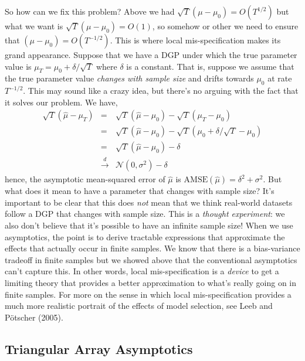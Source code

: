 \documentclass[12pt]{article}
\theoremstyle{definition}
\begin{document}
So how can we fix this problem? Above we had $ \sqrt{T}\left(\mu - \mu_0\right) = O(T^{1/2})$ but what we want is $\sqrt{T}\left(\mu - \mu_0 \right) = O(1)$, so somehow or other we need to ensure that $\left(\mu - \mu_0 \right) = O(T^{-1/2})$. This is where local mis-specification makes its grand appearance. Suppose that we have a DGP under which the true parameter value is $\mu_T = \mu_0 + \delta/\sqrt{T}$ where $\delta$ is a constant. That is, suppose we assume that the true parameter value \emph{changes with sample size} and drifts towards $\mu_0$ at rate $T^{-1/2}$. This may sound like a crazy idea, but there's no arguing with the fact that it solves our problem. We have,
\begin{eqnarray*}
	\sqrt{T}\left( \widehat{\mu} - \mu_T\right) &=& \sqrt{T}\left(\widehat{\mu} - \mu_0 \right) - \sqrt{T}\left(\mu_T - \mu_0 \right)\\
		&=&\sqrt{T}\left(\widehat{\mu} - \mu_0 \right) - \sqrt{T}\left(\mu_0 + \delta/\sqrt{T} - \mu_0 \right)\\
		&=& \sqrt{T}\left(\widehat{\mu} - \mu_0 \right) - \delta\\
		&\overset{d}{\rightarrow}& \mathcal{N}(0, \sigma^2) - \delta
\end{eqnarray*}
hence, the asymptotic mean-squared error of $\widehat{\mu}$ is $\mbox{AMSE}(\widehat{\mu}) = \delta^2 + \sigma^2$. But what does it mean to have a parameter that changes with sample size? It's important to be clear that this does \emph{not} mean that we think real-world datasets follow a DGP that changes with sample size. This is a \emph{thought experiment}: we also don't believe that it's possible to have an infinite sample size! When we use asymptotics, the point is to derive tractable expressions that approximate the effects that actually occur in finite samples. We know that there is a bias-variance tradeoff in finite samples but we showed above that the conventional asymptotics can't capture this. In other words, local mis-specification is a \emph{device} to get a limiting theory that provides a better approximation to what's really going on in finite samples. For more on the sense in which local mis-specification provides a much more realistic portrait of the effects of model selection, see Leeb and P\"{o}tscher (2005).



\subsection{Triangular Array Asymptotics}
\end{document}
